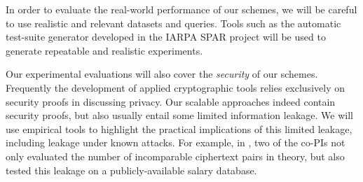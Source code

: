 In order to evaluate the real-world performance of our schemes, we will
be careful to use realistic and relevant datasets and queries. Tools
such as the automatic test-suite generator developed in the IARPA SPAR
project \cite{HH14,varia2015automated} will be used to generate
repeatable and realistic experiments.

Our experimental evaluations will also cover the \emph{security} of our
schemes. Frequently the development of applied cryptographic tools
relies exclusively on security proofs in
discussing privacy. Our scalable approaches indeed contain security
proofs, but also usually entail some limited information leakage.
We will use empirical tools to highlight the practical
implications of this limited leakage, including leakage under known
attacks. For example, in \cite{CCS:RACY16}, two of the co-PIs not only
evaluated the number of incomparable ciphertext pairs in theory, but
also tested this leakage on a publicly-available salary database.
